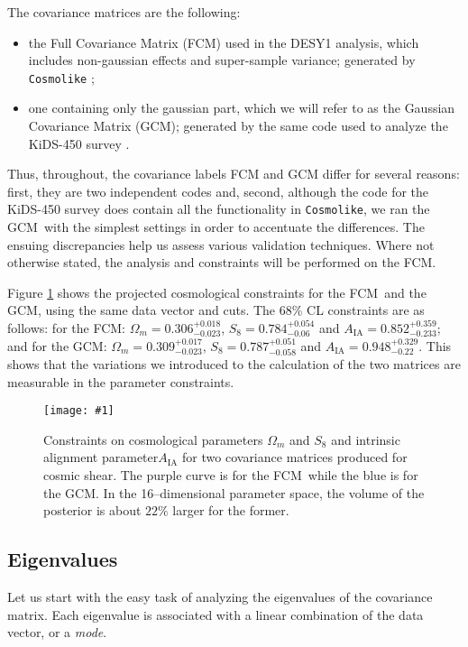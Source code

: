 \documentclass[aps, prd, twocolumn, superscriptaddress, nofootinbib, amssymb, amsmath]{revtex4-2}
\newcommand{\sfig}[2]{
	\texttt{[image: \#1]}
}
\newcommand{\Sfig}[3]{
	\begin{figure}[#1]
		\sfig{../figures/#2.pdf}{\columnwidth}
		\caption{#3}
		\label{fig:#2}
	\end{figure}
}
\newcommand{\rf}[1]{Figure \ref{fig:#1}}
\newcommand\full{the FCM}
\newcommand\gaussian{the GCM}
\begin{document}
The covariance matrices are the following:
\begin{itemize}
	\item the Full Covariance Matrix (FCM) used in the DESY1 analysis, which includes non-gaussian effects and super-sample variance; generated by \texttt{Cosmolike} \cite{Krause:2016jvl};
	\item one containing only the gaussian part, which we will refer to as the Gaussian Covariance Matrix (GCM); generated by the same code used to analyze the KiDS-450 survey \cite{Kohlinger:2017sxk, Joachimi:2020blm}.
\end{itemize}
Thus, throughout, the covariance labels FCM and GCM differ for several reasons: first, they are two independent codes	and, second, although the code for the KiDS-450 survey does contain all the functionality in \texttt{Cosmolike}, we ran \gaussian\ with the simplest settings in order to accentuate the differences. The ensuing discrepancies help us assess various validation techniques. Where not otherwise stated, the analysis and constraints will be performed on \full.

\rf{Y1-constraints_wmS8A} shows the projected cosmological constraints for \full\ and \gaussian, using the same data vector and cuts. The 68\% CL constraints are as follows: for \full: $\Omega_m = 0.306^{+ 0.018}_{- 0.023}$, $S_8 = 0.784^{+ 0.054}_{- 0.06}$ and $A_{\text{IA}} = 0.852^{+ 0.359}_{- 0.233}$; and for \gaussian: $\Omega_m = 0.309^{+ 0.017}_{- 0.023}$, $S_8 = 0.787^{+ 0.051}_{- 0.058}$ and $A_{\text{IA}} = 0.948^{+ 0.329}_{- 0.22}$. This shows that the variations we introduced to the calculation of the two matrices are measurable in the parameter constraints.

\Sfig{thbp}{Y1-constraints_wmS8A}{Constraints on cosmological parameters $\Omega_m$ and $S_8$ and intrinsic alignment parameter$A_{\text{IA}}$ for two covariance matrices produced for cosmic shear. The purple curve is for \full\ while the blue is for \gaussian. In the 16--dimensional parameter space, the volume of the posterior is about $22\%$ larger for the former.}

\subsection{Eigenvalues}
\label{subsec:eigenvalues}

Let us start with the easy task of analyzing the eigenvalues of the covariance matrix. Each eigenvalue is associated with a linear combination of the data vector, or a \emph{mode}.
\end{document}
